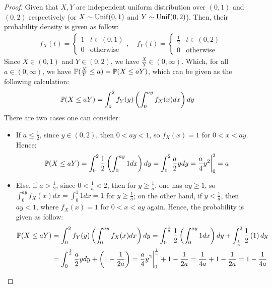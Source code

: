 \documentclass{article}
\begin{document}
\begin{proof}
    Given that $X,Y$ are independent uniform distribution over $(0,1)$ and $(0,2)$ respectively (or $X\sim \mathrm{Unif}(0,1)$ and $Y\sim \mathrm{Unif}(0,2)$). Then, their probability density is given as follow:
    \begin{align}
        f_X(t)=\begin{cases}
            1 & t\in(0,1)\\
            0 & \text{otherwise}
        \end{cases},\quad f_Y(t) = \begin{cases}
            \frac{1}{2} & t\in(0,2)\\
            0 & \text{otherwise}
        \end{cases}
    \end{align}
    Since $X\in (0,1)$ and $Y\in (0,2)$, we have $\frac{X}{Y}\in (0,\infty)$. Which, for all $a\in (0,\infty)$, we have $\mathbb{P}(\frac{X}{Y}\leq a) = \mathbb{P}(X\leq aY)$, which can be given as the following calculation:
    \begin{align}
        \mathbb{P}(X\leq aY)&= \int_{0}^{2}f_Y(y)\left(\int_{0}^{ay}f_X(x)dx\right)dy
    \end{align}
    There are two cases one can consider:
    \begin{itemize}
        \item If $a\leq \frac{1}{2}$, since $y\in(0,2)$, then $0<ay<1$, so $f_X(x)=1$ for $0<x<ay$. Hence:
        \begin{align}
            \mathbb{P}(X\leq aY)=\int_{0}^{2}\frac{1}{2}\left(\int_{0}^{ay}1 dx\right)dy = \int_{0}^{2}\frac{a}{2}ydy = \frac{a}{4}y^2\bigg|_{0}^{2}=a
        \end{align}
        \item Else, if $a>\frac{1}{2}$, since $0<\frac{1}{a}<2$, then for $y\geq \frac{1}{a}$, one has $ay \geq 1$, so $\int_{0}^{ay}f_X(x)dx = \int_{0}^{1}1 dx = 1$ for $y\geq \frac{1}{a}$; on the other hand, if $y< \frac{1}{a}$, then $ay<1$, where $f_X(x) = 1$ for $0<x<ay$ again. Hence, the probability is given as follow:
        \begin{align}
            \PP(X\leq aY)&=\int_{0}^{2}f_Y(y)\left(\int_{0}^{ay}f_X(x)dx\right)dy = \int_{0}^{\frac{1}{a}}\frac{1}{2}\left(\int_{0}^{ay}1 dx\right)dy+\int_{\frac{1}{a}}^{2}\frac{1}{2}\left(1\right)dy\\
            &= \int_{0}^{\frac{1}{a}}\frac{a}{2}ydy + \left(1-\frac{1}{2a}\right) = \frac{a}{4}y^2\bigg|_{0}^{\frac{1}{a}}+1-\frac{1}{2a} = \frac{1}{4a}+1-\frac{1}{2a}=1-\frac{1}{4a}

\end{align}
\end{itemize}
\end{proof}
\end{document}
